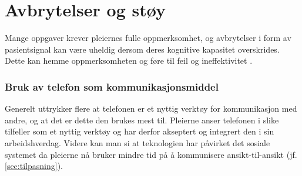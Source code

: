\section{Avbrytelser og støy}
Mange oppgaver krever pleiernes fulle oppmerksomhet, og avbrytelser i form av pasientsignal kan være uheldig dersom deres kognitive kapasitet overskrides. Dette kan hemme oppmerksomheten og føre til feil og ineffektivitet \citep{Ebright10, Parker00}.

\subsubsection{Bruk av telefon som kommunikasjonsmiddel}
Generelt uttrykker flere at telefonen er et nyttig verktøy for kommunikasjon med andre, og at det er dette den brukes mest til. Pleierne anser telefonen i slike tilfeller som et nyttig verktøy og har derfor akseptert og integrert den i sin arbeidshverdag. Videre kan man si at teknologien har påvirket det sosiale systemet da pleierne nå bruker mindre tid på å kommunisere ansikt-til-ansikt (jf. \ref{sec:tilpasning}).

